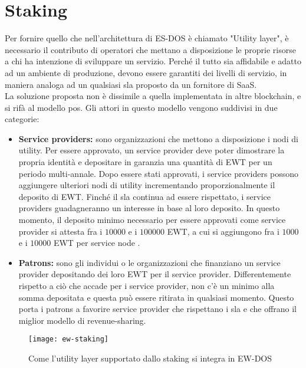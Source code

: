 \section{Staking}
Per fornire quello che nell'architettura di ES-DOS è chiamato "Utility layer", è necessario il contributo di operatori che mettano a disposizione le proprie risorse a chi ha intenzione di sviluppare un servizio.
Perché il tutto sia affidabile e adatto ad un ambiente di produzione, devono essere garantiti dei livelli di servizio, in maniera analoga ad un qualsiasi \gls{sla} proposto da un fornitore di SaaS. \\
La soluzione proposta non è dissimile a quella implementata in altre blockchain, e si rifà al modello \gls{pos}.
Gli attori in questo modello vengono suddivisi in due categorie:

\begin{itemize}
    \item \textbf{Service providers:} sono organizzazioni che mettono a disposizione i nodi di utility.
          Per essere approvato, un service provider deve poter dimostrare la propria identità e depositare in garanzia una quantità di EWT per un periodo multi-annale.
          Dopo essere stati approvati, i service providers possono aggiungere ulteriori nodi di utility incrementando proporzionalmente il deposito di EWT.
          Finché il \gls{sla} continua ad essere rispettato, i service providers guadagneranno un interesse in base al loro deposito.
          In questo momento, il deposito minimo necessario per essere approvati come service provider si attesta fra i $10000$ e i $100000$ EWT, a cui si aggiungono fra i $1000$ e i $10000$ EWT per service node \cite{art:ew-staking}.
    \item \textbf{Patrons:} sono gli individui o le organizzazioni che finanziano un service provider depositando dei loro EWT per il service provider.
          Differentemente rispetto a ciò che accade per i service provider, non c'è un minimo alla somma depositata e questa può essere ritirata in qualsiasi momento.
          Questo porta i patrons a favorire service provider che rispettano i \gls{sla} e che offrano il miglior modello di revenue-sharing.
\end{itemize}

\begin{figure}[h]
    \texttt{[image: ew-staking]}
    \centering
    \caption{Come l'utility layer supportato dallo staking si integra in EW-DOS \cite{art:ew-staking}}
    \label{lab:ew-staking}
\end{figure}